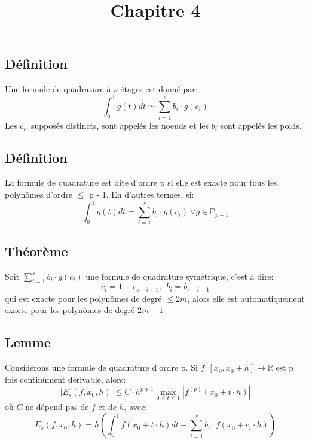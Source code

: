 \documentclass{article}
\title{Chapitre 4}
\newcommand{\R}{\mathbb{R}}
\begin{document}
\maketitle
\section{}
\section{}
\section{}
\section{}

\subsection{Définition}
Une formule de quadrature à $s$ étages est donné par:
$$\int_{0}^{1}g(t)dt \simeq \sum_{i = 1}^{s}b_i\cdot g(c_i)$$
Les $c_i$, supposés distincts, sont appelés les noeuds et les $b_i$ sont appelés les poids.

\subsection{}
\subsection{Définition}
La formule de quadrature est dite d'ordre p si elle est exacte pour tous les polynômes d'ordre $\leq$ p - 1. En d'autres termes, si:
$$\int_{0}^{1}g(t)dt = \sum_{i = 1}^{s}b_i\cdot g(c_i) \ \forall g \in {\mathbb{P}}_{p - 1}$$

\subsection{Théorème}
Soit $\sum_{i = 1}^{s}b_i \cdot g(c_i)$ une formule de quadrature symétrique, c'est à dire:
$$ c_i = 1 - c_{s - i + 1},\ \ b_i = b_{s - i + 1}$$
qui est exacte pour les polynômes de degré $\leq 2m$, alors elle est automatiquement exacte pour les polynômes de degré $2m + 1$

\subsection{Lemme}
Considérons une formule de quadrature d'ordre p. Si $f: [x_0, x_0 + h] \rightarrow \R$ est p fois continûment dérivable, alors:
$$|E_s(f, x_0, h)| \leq C\cdot h^{p + 1} \max_{0 \leq t \leq 1}|f^{(p)}(x_0 + t\cdot h)|$$
où $C$ ne dépend pas de $f$ et de $h$, avec:
$$E_s(f, x_0, h) = h(\int_{0}^{1}f(x_0 + t \cdot h)dt - \sum_{i = 1}^{s}b_i \cdot f(x_0 + c_i \cdot h))$$
\end{document}
